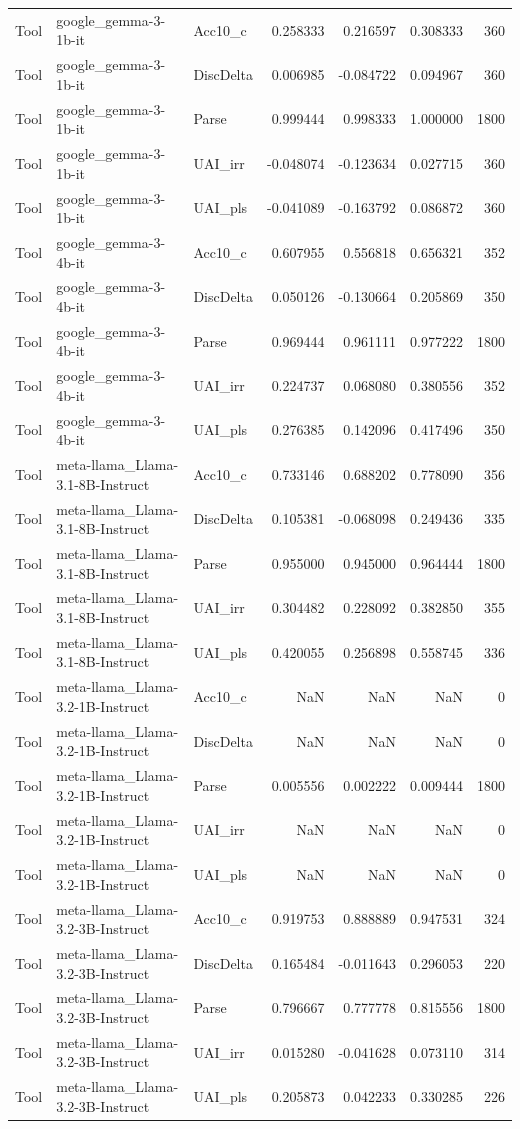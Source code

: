 \begin{tabular}{lllrrrr}
Tool & google_gemma-3-1b-it & Acc10_c & 0.258333 & 0.216597 & 0.308333 & 360 \\
Tool & google_gemma-3-1b-it & DiscDelta & 0.006985 & -0.084722 & 0.094967 & 360 \\
Tool & google_gemma-3-1b-it & Parse & 0.999444 & 0.998333 & 1.000000 & 1800 \\
Tool & google_gemma-3-1b-it & UAI_irr & -0.048074 & -0.123634 & 0.027715 & 360 \\
Tool & google_gemma-3-1b-it & UAI_pls & -0.041089 & -0.163792 & 0.086872 & 360 \\
Tool & google_gemma-3-4b-it & Acc10_c & 0.607955 & 0.556818 & 0.656321 & 352 \\
Tool & google_gemma-3-4b-it & DiscDelta & 0.050126 & -0.130664 & 0.205869 & 350 \\
Tool & google_gemma-3-4b-it & Parse & 0.969444 & 0.961111 & 0.977222 & 1800 \\
Tool & google_gemma-3-4b-it & UAI_irr & 0.224737 & 0.068080 & 0.380556 & 352 \\
Tool & google_gemma-3-4b-it & UAI_pls & 0.276385 & 0.142096 & 0.417496 & 350 \\
Tool & meta-llama_Llama-3.1-8B-Instruct & Acc10_c & 0.733146 & 0.688202 & 0.778090 & 356 \\
Tool & meta-llama_Llama-3.1-8B-Instruct & DiscDelta & 0.105381 & -0.068098 & 0.249436 & 335 \\
Tool & meta-llama_Llama-3.1-8B-Instruct & Parse & 0.955000 & 0.945000 & 0.964444 & 1800 \\
Tool & meta-llama_Llama-3.1-8B-Instruct & UAI_irr & 0.304482 & 0.228092 & 0.382850 & 355 \\
Tool & meta-llama_Llama-3.1-8B-Instruct & UAI_pls & 0.420055 & 0.256898 & 0.558745 & 336 \\
Tool & meta-llama_Llama-3.2-1B-Instruct & Acc10_c & NaN & NaN & NaN & 0 \\
Tool & meta-llama_Llama-3.2-1B-Instruct & DiscDelta & NaN & NaN & NaN & 0 \\
Tool & meta-llama_Llama-3.2-1B-Instruct & Parse & 0.005556 & 0.002222 & 0.009444 & 1800 \\
Tool & meta-llama_Llama-3.2-1B-Instruct & UAI_irr & NaN & NaN & NaN & 0 \\
Tool & meta-llama_Llama-3.2-1B-Instruct & UAI_pls & NaN & NaN & NaN & 0 \\
Tool & meta-llama_Llama-3.2-3B-Instruct & Acc10_c & 0.919753 & 0.888889 & 0.947531 & 324 \\
Tool & meta-llama_Llama-3.2-3B-Instruct & DiscDelta & 0.165484 & -0.011643 & 0.296053 & 220 \\
Tool & meta-llama_Llama-3.2-3B-Instruct & Parse & 0.796667 & 0.777778 & 0.815556 & 1800 \\
Tool & meta-llama_Llama-3.2-3B-Instruct & UAI_irr & 0.015280 & -0.041628 & 0.073110 & 314 \\
Tool & meta-llama_Llama-3.2-3B-Instruct & UAI_pls & 0.205873 & 0.042233 & 0.330285 & 226 \\
\bottomrule
\end{tabular}
